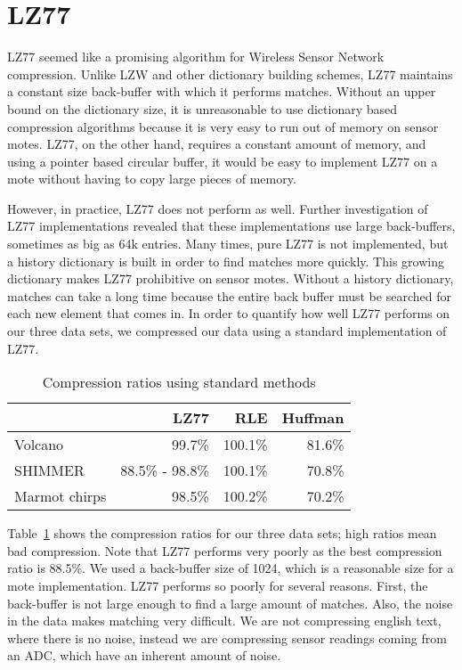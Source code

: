 \section{LZ77}

LZ77 \cite{lz77} seemed like a promising algorithm for Wireless Sensor
Network compression. Unlike LZW \cite{lzw} and other dictionary
building schemes, LZ77 maintains a constant size back-buffer with
which it performs matches. Without an upper bound on the dictionary
size, it is unreasonable to use dictionary based compression
algorithms because it is very easy to run out of memory on sensor
motes. LZ77, on the other hand, requires a constant amount of memory,
and using a pointer based circular buffer, it would be easy to
implement LZ77 on a mote without having to copy large pieces of
memory.

However, in practice, LZ77 does not perform as well. Further
investigation of LZ77 implementations revealed that these
implementations use large back-buffers, sometimes as big as 64k
entries. Many times, pure LZ77 is not implemented, but a history
dictionary is built in order to find matches more quickly. This
growing dictionary makes LZ77 prohibitive on sensor motes. Without a
history dictionary, matches can take a long time because the entire
back buffer must be searched for each new element that comes in. In
order to quantify how well LZ77 performs on our three data sets, we
compressed our data using a standard implementation of LZ77.

\begin{table}
  \begin{center}
  \begin{tabular}{|l||r|r|r|}
    \hline
    & LZ77 & RLE & Huffman \\ \hline
    Volcano & 99.7\% & 100.1\% & 81.6\% \\ \hline
    SHIMMER & 88.5\% - 98.8\% & 100.1\% & 70.8\% \\ \hline
    Marmot chirps & 98.5\% & 100.2\% & 70.2\% \\ \hline
    
  \end{tabular}
  \end{center}
  \caption{Compression ratios using standard methods}
  \label{table:compratios}
\end{table}

Table~\ref{table:compratios} shows the compression ratios for our
three data sets; high ratios mean bad compression. Note that LZ77
performs very poorly as the best compression ratio is 88.5\%. We used
a back-buffer size of 1024, which is a reasonable size for a mote
implementation. LZ77 performs so poorly for several reasons. First,
the back-buffer is not large enough to find a large amount of
matches. Also, the noise in the data makes matching very difficult. We
are not compressing english text, where there is no noise, instead we
are compressing sensor readings coming from an ADC, which have an
inherent amount of noise.

